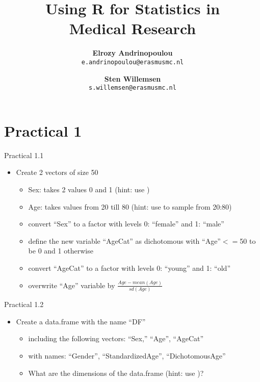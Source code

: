 \documentclass[14pt, aspectratio=169, sectionpage=simple, xclolor=table]{beamer}
\title{Using R for Statistics in \\ Medical Research}
\author{{\large \textbf{Elrozy Andrinopoulou}}\\
	\small{\texttt{e.andrinopoulou@erasmusmc.nl}} \vspace*{1ex} \\
	\and 
	{\large 	\textbf{Sten Willemsen}}\\
	\small{\texttt{s.willemsen@erasmusmc.nl}}}
\institute{Department of Biostatistics, Erasmus University Medical Center}
\begin{document}
	
	
\begin{titleframe}
\end{titleframe}
\section{Practical 1}
\begin{frame}{Practical 1.1}
\begin{itemize}
\item Create 2 vectors of size 50
\begin{itemize}
\item Sex: takes 2 values 0 and 1 (hint: use )
\item Age: takes values from 20 till 80 (hint: use  to sample from 20:80)
\item convert \enquote{Sex} to a factor with levels 0: \enquote{female} and 1: \enquote{male}
\item define the new variable \enquote{AgeCat} as dichotomous with \enquote{Age}$<=$50 to be 0 and 1 otherwise
\item convert \enquote{AgeCat} to a factor with levels 0: \enquote{young} and 1: \enquote{old}
\item overwrite \enquote{Age} variable by $\frac{Age-mean(Age)}{sd(Age)}$
\end{itemize}
\end{itemize}
\mbox{}
\end{frame}

\begin{frame}{Practical 1.2}
\begin{itemize}
\item Create a data.frame with the name \enquote{DF}
\begin{itemize}
\item including the following vectors: \enquote{Sex,} \enquote{Age}, \enquote{AgeCat}
\item with names: \enquote{Gender}, \enquote{StandardizedAge}, \enquote{DichotomousAge}
\item What are the dimensions of the data.frame (hint: use )?
\end{itemize}
\end{itemize}
\end{frame}
\end{document}
